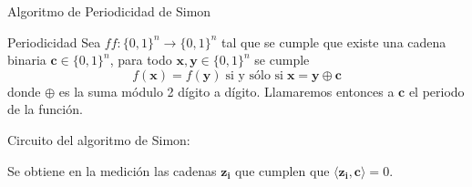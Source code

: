 \documentclass[10pt,compress]{beamer}
\begin{document}
\begin{frame}{Algoritmo de Periodicidad de Simon}
\begin{block}{Periodicidad}
Sea $ff:\{0,1\}^n \longrightarrow \{0,1\}^n$ tal que se cumple que existe una cadena binaria $\mathbf{c}\in\{0,1\}^n$, para todo $\mathbf{x}, \mathbf{y}\in\{0,1\}^n$ se cumple
\begin{equation}
f(\mathbf{x}) = f(\mathbf{y}) \; \text{si y sólo si} \; \mathbf{x} = \mathbf{y}\oplus \mathbf{c}
\end{equation}
donde $\oplus$ es la suma módulo 2 dígito a dígito. Llamaremos entonces a $\mathbf{c}$ el periodo de la función.
\end{block}
\pause
Circuito del algoritmo de Simon:
\begin{center}
\end{center}
\pause
Se obtiene en la medición las cadenas $\mathbf{z_i}$ que cumplen que $\langle \mathbf{z_i}, \mathbf{c} \rangle = 0$.

\end{frame}
\end{document}
